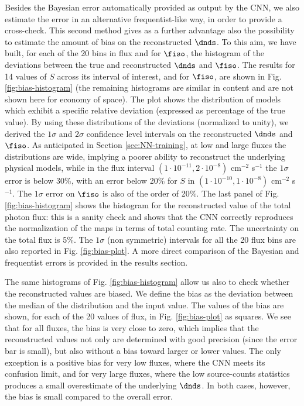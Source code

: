 Besides the Bayesian error automatically provided as output by the CNN, we also estimate the error in an alternative frequentist-like way, in order to provide a cross-check. This second method gives as a further advantage also the possibility to estimate the amount of bias on the reconstructed $\dnds$.
To this aim, we have built, for each of the 20 bins in flux and for $\fiso$, the histogram of the deviations between the true and reconstructed $\dnds$  and $\fiso$. The results for 14 values of $S$ across its interval of interest, and for $\fiso$, are shown in Fig. \ref{fig:bias-histogram} (the remaining histograms are similar in content and are not shown here for economy of space). The plot shows the distribution of models which exhibit a specific relative deviation (expressed as percentage of the true value). By using these
distributions of the deviations (normalized to unity), we derived the $1\sigma$ and $2\sigma$ confidence level intervals on the reconstructed $\dnds$ and $\fiso$. As anticipated in Section \ref{sec:NN-training}, at low and large fluxes the distributions are wide, implying a poorer ability to reconstruct the underlying physical models, while in the flux interval $(1 \cdot 10^{-11}, 2 \cdot 10^{-8})$ cm$^{-2}$ s$^{-1}$ the $1\sigma$ error is below 30\%, with an error below 20\% for $S$ in $(1 \cdot 10^{-10}, 1 \cdot 10^{-8})$ cm$^{-2}$ s$^{-1}$. The $1\sigma$ error on $\fiso$ is also of the order of 20\%. The last panel of Fig. \ref{fig:bias-histogram} shows the histogram for the reconstructed value of the total photon flux: this is a sanity check and shows that the CNN correctly reproduces the normalization of the maps in terms of total counting rate. The uncertainty on the total flux is 5\%. The $1\sigma$ (non symmetric) intervals for all the 20 flux bins are also reported in Fig. \ref{fig:bias-plot}.
A more direct comparison of the Bayesian and frequentist errors is provided in the results section.

The same histograms of Fig. \ref{fig:bias-histogram} allow us also to check whether the reconstructed values are biased. We define the bias as the deviation between the median of the distribution and the input value. The values of the bias are shown, for each of the 20 values of flux, in Fig. \ref{fig:bias-plot} as squares. We see that for all fluxes, the bias is very close to zero, which implies that the reconstructed values not only are determined with good precision (since the error bar is small), but also without a  bias toward larger or lower values. The only exception is a positive bias for very low fluxes, where the CNN meets its confusion limit, and for very large fluxes, where the low source-counts statistics produces a small overestimate of the underlying $\dnds$.
In both cases, however, the bias is small compared to the overall error.

